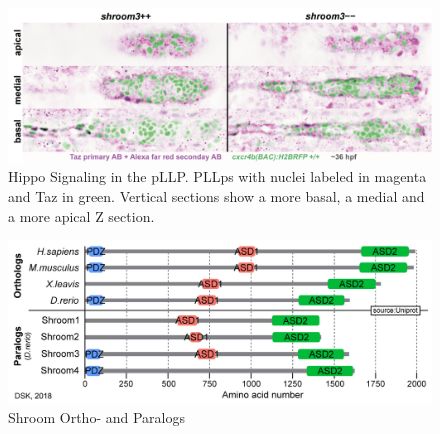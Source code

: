 \documentclass[11pt,singlespacinge,twoside]{reedthesis} %
\theoremstyle{definition}
\theoremstyle{definition}
\theoremstyle{definition}
\theoremstyle{remark}
\begin{document}
\begin{figure}[H]

{\centering \includegraphics[width=0.9\linewidth]{figures/supp/immunos_lab} 

}

\caption[Hippo Signaling in the pLLP]{Hippo Signaling in the pLLP. PLLps with nuclei labeled in magenta and Taz in green. Vertical sections show a more basal, a medial and a more apical Z section.}\label{fig:suppyap}
\end{figure}

\begin{figure}[h]

{\centering \includegraphics[width=0.85\linewidth,]{figures/supp/Shroom3_orthology-01} 

}

\caption[Shroom Ortho- and Paralogs]{Shroom Ortho- and Paralogs}\label{fig:suppshrmort}
\end{figure}
\end{document}
